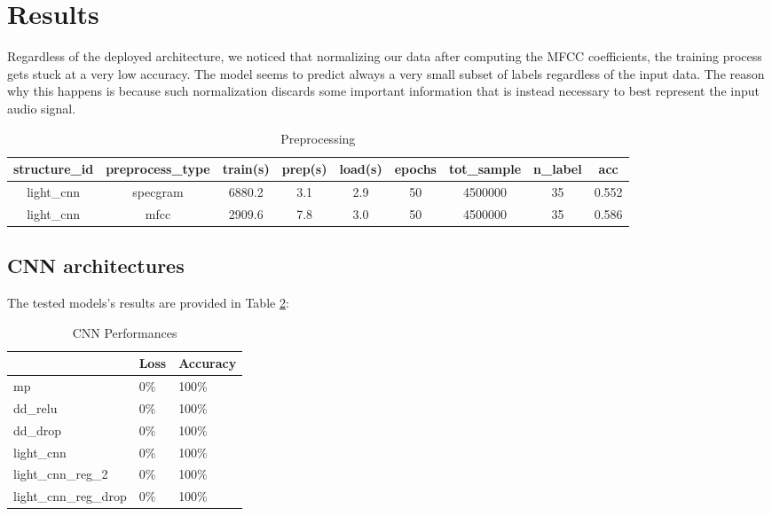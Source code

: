 
\section{Results}
\label{sec:results}

\noindent Regardless of the deployed architecture, we noticed that normalizing our data after computing the MFCC coefficients, the training process gets stuck at a very low accuracy. The model seems to predict always a very small subset of labels regardless of the input data. The reason why this happens is because such normalization discards some important information that is instead necessary to best represent the input audio signal.

\begin{table}[ht]
	\centering
	\begin{tabular}{c c c c c c c c c}
		\hline
		structure\_id & preprocess\_type & train(s) & prep(s) & load(s) & epochs & tot\_sample & n\_label & acc \\
		\hline
		light\_cnn & specgram & 6880.2 & 3.1 &  2.9 & 50 & 4500000 & 35 & 0.552 \\
		light\_cnn & mfcc     & 2909.6 &  7.8 & 3.0 & 50 & 4500000 & 35 & 0.586 \\
		\hline
	\end{tabular}
	\caption{Preprocessing}
	\label{table:Pr_eprocessing}
\end{table}

\subsection{\textbf{CNN architectures}}
The tested models's results are provided in Table \ref{table:cnn_performances}:\\
\begin{table}[h!]
\centering
\begin{tabular}{ p{3cm}|p{1.5cm}|p{1.5cm}| }
 \hline
   & Loss & Accuracy\\
\hline
mp & 0\% & 100\%  \\
dd\_relu & 0\% & 100\% \\
dd\_drop & 0\% & 100\% \\
light\_cnn & 0\% & 100\% \\
light\_cnn\_reg\_2 & 0\% & 100\% \\
light\_cnn\_reg\_drop & 0\% & 100\% \\
\hline
\end{tabular}
\caption{CNN Performances}
\label{table:cnn_performances}
\end{table}

